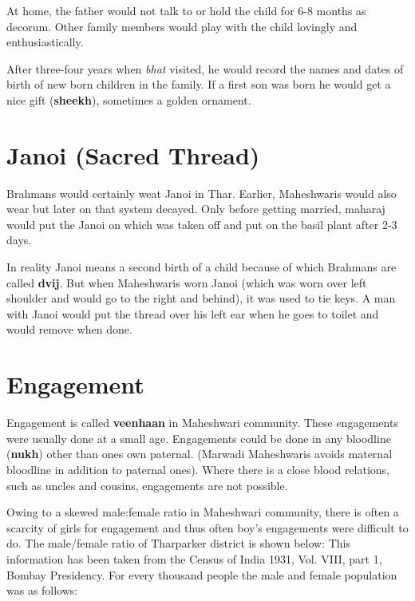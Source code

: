 At home, the father would not talk to or hold the child for 6-8 months as
decorum. Other family members would play with the child lovingly and
enthusiastically.

After three-four years when \textit{bhat} visited, he would record the names
and dates of birth of new born children in the family. If a first son was born
he would get a nice gift (\textbf{sheekh}), sometimes a golden ornament.

\section{Janoi (Sacred Thread)}
Brahmans would certainly weat Janoi in Thar. Earlier, Maheshwaris would also
wear but later on that system decayed. Only before getting married, maharaj
would put the Janoi on which was taken off and put on the basil plant after 2-3
days.

In reality Janoi means a second birth of a child because of which Brahmans are
called \textbf{dvij}. But when Maheshwaris worn Janoi (which was worn over left
shoulder and would go to the right and behind), it was used to tie keys. A man
with Janoi would put the thread over his left ear when he goes to toilet and
would remove when done.

\section{Engagement}
Engagement is called \textbf{veenhaan} in Maheshwari community. These
engagements were usually done at a small age. Engagements could be done in any
bloodline (\textbf{nukh}) other than ones own paternal. (Marwadi Maheshwaris
avoids maternal bloodline in addition to paternal ones). Where there is a close
blood relations, such as uncles and cousins, engagements are not possible.

Owing to a skewed male:female ratio in Maheshwari community, there is often a
scarcity of girls for engagement and thus often boy's engagements were
difficult to do.
The male/female ratio of Tharparker district is shown below: This information has been taken from the Census of India 1931, Vol. VIII, part 1, Bombay Presidency. For every thousand people the male and female population was as follows:

